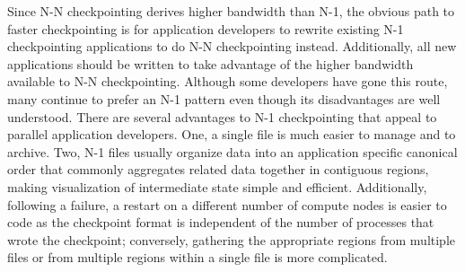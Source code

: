 Since N-N checkpointing derives higher bandwidth than N-1, the obvious path to
faster checkpointing is for application developers to rewrite existing N-1
checkpointing applications to do N-N checkpointing instead.  Additionally, all
new applications should be written to take advantage of the higher bandwidth
available to N-N checkpointing.  Although some developers have gone this route,
many continue to prefer an N-1 pattern even though its disadvantages are well
understood.  There are several advantages to N-1 checkpointing that appeal to
parallel application developers.  One, a single file is much easier to manage
and to archive.  Two, N-1 files usually organize data into an application
specific canonical order that commonly aggregates related data together in
contiguous regions, making visualization of intermediate state simple and
efficient.  Additionally, following a failure, a restart on a different number
of compute nodes is easier to code as the checkpoint format is independent of
the number of processes that wrote the checkpoint; conversely, gathering the
appropriate regions from multiple files or from multiple regions within a
single file is more complicated.  


